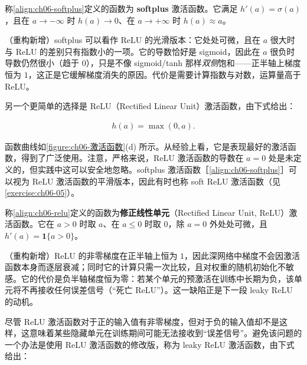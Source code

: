 \documentclass[../../main.tex]{subfiles}
\begin{document}
\begin{definition}[softplus]\label{definition:ch06-softplus}
称\eqref{align:ch06-softplus}定义的函数为 \textbf{softplus} 激活函数。它满足 $h'(a)=\sigma(a)$，且在 $a\to-\infty$ 时 $h(a)\to0$、在 $a\to+\infty$ 时 $h(a)\approx a$。
\end{definition}

\begin{remark}（重构新增）softplus 可以看作 ReLU 的光滑版本：它处处可微，且在 $a$ 很大时与 ReLU 的差别只有指数小的一项。它的导数恰好是 sigmoid，因此在 $a$ 很负时导数仍然很小（趋于 $0$），只是不像 sigmoid/tanh 那样\emph{双侧}饱和——正半轴上梯度恒为 $1$，这正是它缓解梯度消失的原因。代价是需要计算指数与对数，运算量高于 ReLU。
\end{remark}

另一个更简单的选择是 ReLU（Rectified Linear Unit）激活函数，由下式给出：

\begin{align}
h(a)=\max(0,a).
\label{align:ch06-relu}
\end{align}

函数曲线如\cref{figure:ch06-激活函数}(d) 所示。从经验上看，它是表现最好的激活函数，得到了广泛使用。注意，严格来说，ReLU 激活函数的导数在 $a=0$ 处是未定义的，但实践中这可以安全地忽略。softplus 激活函数［\eqref{align:ch06-softplus}］可以视为 ReLU 激活函数的平滑版本，因此有时也称 soft ReLU 激活函数（见\cref{exercise:ch06-05}）。

\begin{definition}[ReLU]\label{definition:ch06-ReLU}
称\eqref{align:ch06-relu}定义的函数为\textbf{修正线性单元}（Rectified Linear Unit, ReLU）激活函数。它在 $a>0$ 时取 $a$、在 $a\leqslant0$ 时取 $0$，除 $a=0$ 外处处可微，且 $h'(a)=\mathbf{1}\{a>0\}$。
\end{definition}

\begin{remark}（重构新增）ReLU 的非零梯度在正半轴上恒为 $1$，因此深网络中梯度不会因激活函数本身而逐层衰减；同时它的计算只需一次比较，且对权重的随机初始化不敏感。它的代价是负半轴梯度恒为零：若某个单元的预激活在训练中长期为负，该单元将不再接收任何误差信号（“死亡 ReLU”）。这一缺陷正是下一段 leaky ReLU 的动机。
\end{remark}

尽管 ReLU 激活函数对于正的输入值有非零梯度，但对于负的输入值却不是这样，这意味着某些隐藏单元在训练期间可能无法接收到“误差信号”。避免该问题的一个办法是使用 ReLU 激活函数的修改版，称为 leaky ReLU 激活函数，由下式给出：
\end{document}
